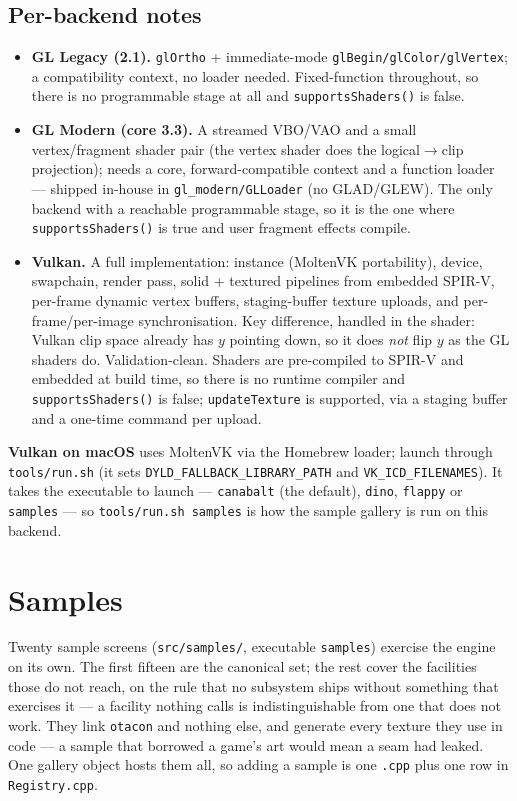\documentclass[11pt]{report}
\newcommand{\code}[1]{\texttt{#1}}
\begin{document}
\section{Per-backend notes}
\begin{itemize}[nosep]
  \item \textbf{GL Legacy (2.1).} \code{glOrtho} + immediate-mode
        \code{glBegin/glColor/glVertex}; a compatibility context, no loader needed.
        Fixed-function throughout, so there is no programmable stage at all and
        \code{supportsShaders()} is false.
  \item \textbf{GL Modern (core 3.3).} A streamed VBO/VAO and a small
        vertex/fragment shader pair (the vertex shader does the logical$\to$clip
        projection); needs a core, forward-compatible context and a function
        loader --- shipped in-house in \code{gl\_modern/GLLoader} (no GLAD/GLEW).
        The only backend with a reachable programmable stage, so it is the one
        where \code{supportsShaders()} is true and user fragment effects compile.
  \item \textbf{Vulkan.} A full implementation: instance (MoltenVK portability),
        device, swapchain, render pass, solid + textured pipelines from embedded
        SPIR-V, per-frame dynamic vertex buffers, staging-buffer texture uploads,
        and per-frame/per-image synchronisation. Key difference, handled in the
        shader: Vulkan clip space already has $y$ pointing down, so it does
        \emph{not} flip $y$ as the GL shaders do. Validation-clean. Shaders are
        pre-compiled to SPIR-V and embedded at build time, so there is no runtime
        compiler and \code{supportsShaders()} is false; \code{updateTexture} is
        supported, via a staging buffer and a one-time command per upload.
\end{itemize}
\textbf{Vulkan on macOS} uses MoltenVK via the Homebrew loader; launch through
\code{tools/run.sh} (it sets \code{DYLD\_FALLBACK\_LIBRARY\_PATH} and
\code{VK\_ICD\_FILENAMES}). It takes the executable to launch --- \code{canabalt}
(the default), \code{dino}, \code{flappy} or \code{samples} --- so
\code{tools/run.sh samples} is how the sample gallery is run on this backend.

\chapter{Samples}\label{ch:samples}
Twenty sample screens (\code{src/samples/}, executable \code{samples}) exercise
the engine on its own. The first fifteen are the canonical set; the rest cover
the facilities those do not reach, on the rule that no subsystem ships without
something that exercises it --- a facility nothing calls is indistinguishable
from one that does not work. They link \code{otacon} and nothing else, and generate
every texture they use in code --- a sample that borrowed a game's art would mean
a seam had leaked. One gallery object hosts them all, so adding a sample is one
\code{.cpp} plus one row in \code{Registry.cpp}.
\end{document}
